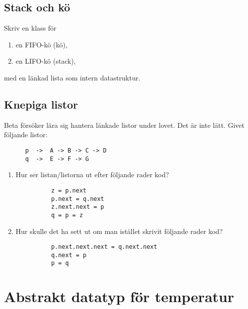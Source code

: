 \subsection{Stack och kö}

\begin{frame}
  \begin{exercise}
    Skriv en klass för
    \begin{enumerate}
      \item en FIFO-kö (kö),
      \item en LIFO-kö (stack),
    \end{enumerate}
    med en länkad lista som intern datastruktur.
  \end{exercise}
\end{frame}

\subsection{Knepiga listor}

\begin{frame}[fragile]
  \begin{exercise}
    Beta försöker lära sig hantera länkade listor under lovet. Det är inte 
    lätt. Givet följande listor:
    \begin{verbatim}
      p  ->  A -> B -> C -> D
      q  ->  E -> F -> G
    \end{verbatim}
    \begin{enumerate}
      \item Hur ser listan/listorna ut efter följande rader kod?
        \begin{verbatim}
          z = p.next
          p.next = q.next
          z.next.next = p
          q = p = z
        \end{verbatim}

      \item Hur skulle det ha sett ut om man istället skrivit följande rader 
        kod?
        \begin{verbatim}
          p.next.next.next = q.next.next
          q.next = p
          p = q
        \end{verbatim}
    \end{enumerate}
  \end{exercise}
\end{frame}

\section[Abstrakt datatyp]{Abstrakt datatyp för temperatur}

